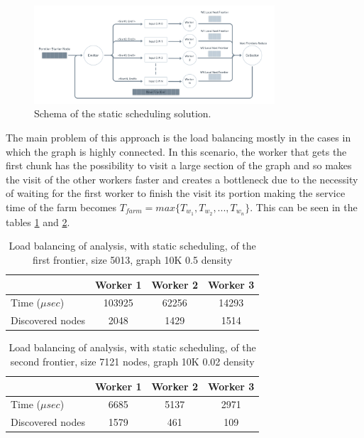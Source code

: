 \begin{figure}[htb!]
    \centering
    \includegraphics[width=0.8\textwidth]{Figures/par_schema.png}
    \caption{Schema of the static scheduling solution.}
    \label{fig:bfs_par_1_schema}
\end{figure}
\FloatBarrier

The main problem of this approach is the load balancing mostly in the cases in which the graph is highly connected. In this scenario, the worker that gets the first chunk has the possibility to visit a large section of the graph and so makes the visit of the other workers faster and creates a bottleneck due to the necessity of waiting for the first worker to finish the visit its portion making the service time of the farm becomes $T_{farm} = max\{T_{w_1}, T_{w_2}, ..., T_{w_n}\}$.  
This can be seen in the tables \ref{table:sched_st1} and \ref{table:sched_st2}.


\begin{table}[htb!]
\centering
\begin{tabular}{l|c|c|c|}
\cline{2-4}
\multicolumn{1}{c|}{}                  & Worker 1 & Worker 2 & Worker 3 \\ \hline
\multicolumn{1}{|l|}{Time ($\mu sec$)}             & 103925    & 62256    & 14293     \\ \hline
\multicolumn{1}{|l|}{Discovered nodes} & 2048     & 1429     & 1514     \\ \hline
\end{tabular}
\caption{Load balancing of analysis, with static scheduling, of the first frontier, size 5013, graph 10K 0.5 density}
\label{table:sched_st1}
\end{table}


\begin{table}[htb!]
\centering
\begin{tabular}{l|c|c|c|}
\cline{2-4}
\multicolumn{1}{c|}{}                  & Worker 1 & Worker 2 & Worker 3 \\ \hline
\multicolumn{1}{|l|}{Time ($\mu sec$)}             & 6685    & 5137    & 2971     \\ \hline
\multicolumn{1}{|l|}{Discovered nodes} & 1579     & 461     & 109     \\ \hline
\end{tabular}
\caption{Load balancing of analysis, with static scheduling, of the second frontier, size 7121 nodes, graph 10K 0.02 density}
\label{table:sched_st2}
\end{table}
\FloatBarrier


